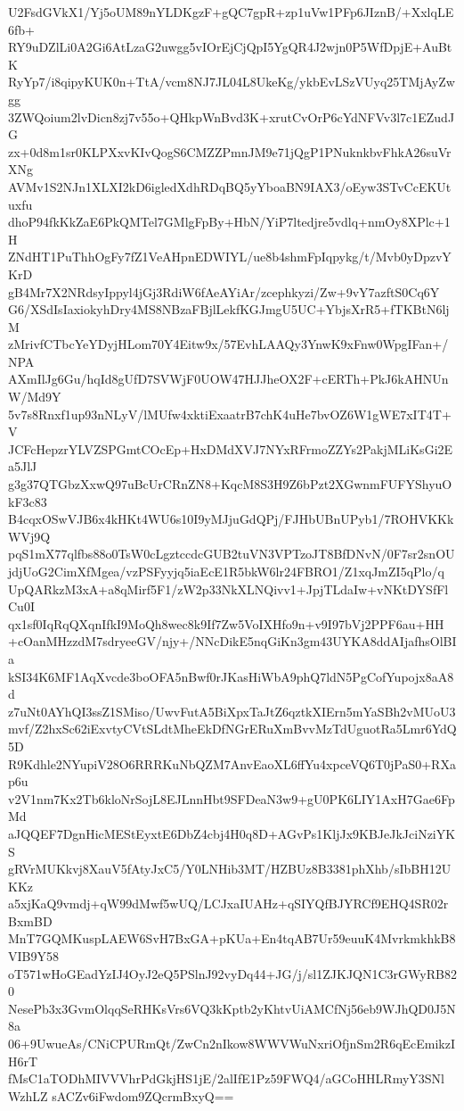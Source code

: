 U2FsdGVkX1/Yj5oUM89nYLDKgzF+gQC7gpR+zp1uVw1PFp6JIznB/+XxlqLE6fb+
RY9uDZlLi0A2Gi6AtLzaG2uwgg5vIOrEjCjQpI5YgQR4J2wjn0P5WfDpjE+AuBtK
RyYp7/i8qipyKUK0n+TtA/vcm8NJ7JL04L8UkeKg/ykbEvLSzVUyq25TMjAyZwgg
3ZWQoium2lvDicn8zj7v55o+QHkpWnBvd3K+xrutCvOrP6cYdNFVv3l7c1EZudJG
zx+0d8m1sr0KLPXxvKIvQogS6CMZZPmnJM9e71jQgP1PNuknkbvFhkA26suVrXNg
AVMv1S2NJn1XLXI2kD6igledXdhRDqBQ5yYboaBN9IAX3/oEyw3STvCcEKUtuxfu
dhoP94fkKkZaE6PkQMTel7GMlgFpBy+HbN/YiP7ltedjre5vdlq+nmOy8XPlc+1H
ZNdHT1PuThhOgFy7fZ1VeAHpnEDWIYL/ue8b4shmFpIqpykg/t/Mvb0yDpzvYKrD
gB4Mr7X2NRdsyIppyl4jGj3RdiW6fAeAYiAr/zcephkyzi/Zw+9vY7azftS0Cq6Y
G6/XSdIsIaxiokyhDry4MS8NBzaFBjlLekfKGJmgU5UC+YbjsXrR5+fTKBtN6ljM
zMrivfCTbcYeYDyjHLom70Y4Eitw9x/57EvhLAAQy3YnwK9xFnw0WpgIFan+/NPA
AXmIlJg6Gu/hqId8gUfD7SVWjF0UOW47HJJheOX2F+cERTh+PkJ6kAHNUnW/Md9Y
5v7s8Rnxf1up93nNLyV/lMUfw4xktiExaatrB7chK4uHe7bvOZ6W1gWE7xIT4T+V
JCFcHepzrYLVZSPGmtCOcEp+HxDMdXVJ7NYxRFrmoZZYs2PakjMLiKsGi2Ea5JlJ
g3g37QTGbzXxwQ97uBcUrCRnZN8+KqcM8S3H9Z6bPzt2XGwnmFUFYShyuOkF3c83
B4cqxOSwVJB6x4kHKt4WU6s10I9yMJjuGdQPj/FJHbUBnUPyb1/7ROHVKKkWVj9Q
pqS1mX77qlfbs88o0TsW0cLgztccdcGUB2tuVN3VPTzoJT8BfDNvN/0F7sr2snOU
jdjUoG2CimXfMgea/vzPSFyyjq5iaEcE1R5bkW6lr24FBRO1/Z1xqJmZI5qPlo/q
UpQARkzM3xA+a8qMirf5F1/zW2p33NkXLNQivv1+JpjTLdaIw+vNKtDYSfFlCu0I
qx1sf0IqRqQXqnIfkI9MoQh8wec8k9If7Zw5VoIXHfo9n+v9I97bVj2PPF6au+HH
+cOanMHzzdM7sdryeeGV/njy+/NNcDikE5nqGiKn3gm43UYKA8ddAIjafhsOlBIa
kSI34K6MF1AqXvcde3boOFA5nBwf0rJKasHiWbA9phQ7ldN5PgCofYupojx8aA8d
z7uNt0AYhQI3ssZ1SMiso/UwvFutA5BiXpxTaJtZ6qztkXIErn5mYaSBh2vMUoU3
mvf/Z2hxSc62iExvtyCVtSLdtMheEkDfNGrERuXmBvvMzTdUguotRa5Lmr6YdQ5D
R9Kdhle2NYupiV28O6RRRKuNbQZM7AnvEaoXL6ffYu4xpceVQ6T0jPaS0+RXap6u
v2V1nm7Kx2Tb6kloNrSojL8EJLnnHbt9SFDeaN3w9+gU0PK6LIY1AxH7Gae6FpMd
aJQQEF7DgnHicMEStEyxtE6DbZ4cbj4H0q8D+AGvPs1KljJx9KBJeJkJciNziYKS
gRVrMUKkvj8XauV5fAtyJxC5/Y0LNHib3MT/HZBUz8B3381phXhb/sIbBH12UKKz
a5xjKaQ9vmdj+qW99dMwf5wUQ/LCJxaIUAHz+qSIYQfBJYRCf9EHQ4SR02rBxmBD
MnT7GQMKuspLAEW6SvH7BxGA+pKUa+En4tqAB7Ur59euuK4MvrkmkhkB8VIB9Y58
oT571wHoGEadYzIJ4OyJ2eQ5PSlnJ92vyDq44+JG/j/sl1ZJKJQN1C3rGWyRB820
NesePb3x3GvmOlqqSeRHKsVrs6VQ3kKptb2yKhtvUiAMCfNj56eb9WJhQD0J5N8a
06+9UwueAs/CNiCPURmQt/ZwCn2nIkow8WWVWuNxriOfjnSm2R6qEcEmikzIH6rT
fMsC1aTODhMIVVVhrPdGkjHS1jE/2alIfE1Pz59FWQ4/aGCoHHLRmyY3SNlWzhLZ
sACZv6iFwdom9ZQcrmBxyQ==
